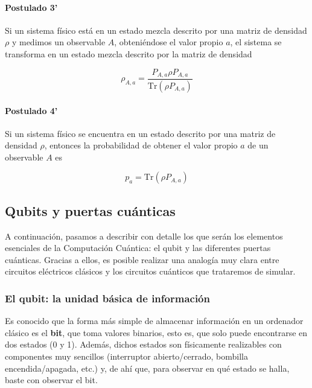 \documentclass[11pt,a4paper,twoside,pdf]{article}
\numberwithin{equation}{section}
\begin{document}
		\paragraph{Postulado 3'} \label{Par: Postulado 3.2}
			Si un sistema físico está en un estado mezcla descrito por una matriz de densidad $\rho$ y medimos un observable $A$, obteniéndose el valor propio $a$, el sistema se transforma en un estado mezcla descrito por la matriz de densidad
			
			\begin{equation}
					\rho_{A,a}=\frac{P_{A,a}\rho P_{A,a}}{\text{Tr}(\rho P_{A,a})}
			\end{equation} 
		
		\paragraph{Postulado 4'} \label{Par: Postulado 4.2}
			Si un sistema físico se encuentra en un estado descrito por una matriz de densidad $\rho$, entonces la probabilidad de obtener el valor propio $a$ de un observable $A$ es
			
			\begin{equation}
				p_a = \text{Tr}(\rho P_{A,a})
			\end{equation}
				
			
	\subsection{Qubits y puertas cuánticas}
		
	A continuación, pasamos a describir con detalle los que serán los elementos esenciales de la Computación Cuántica: el qubit y las diferentes puertas cuánticas. Gracias a ellos, es posible realizar una analogía muy clara entre circuitos eléctricos clásicos y los circuitos cuánticos que trataremos de simular.
						
		\subsubsection{El qubit: la unidad básica de información}
			
		Es conocido que la forma más simple de almacenar información en un ordenador clásico es el \textbf{bit}, que toma valores binarios, esto es, que solo puede encontrarse en dos estados (0 y 1). Además, dichos estados son físicamente realizables con componentes muy sencillos (interruptor abierto/cerrado, bombilla encendida/apagada, etc.) y, de ahí que, para observar en qué estado se halla, baste con observar el bit. 
				
\end{document}
